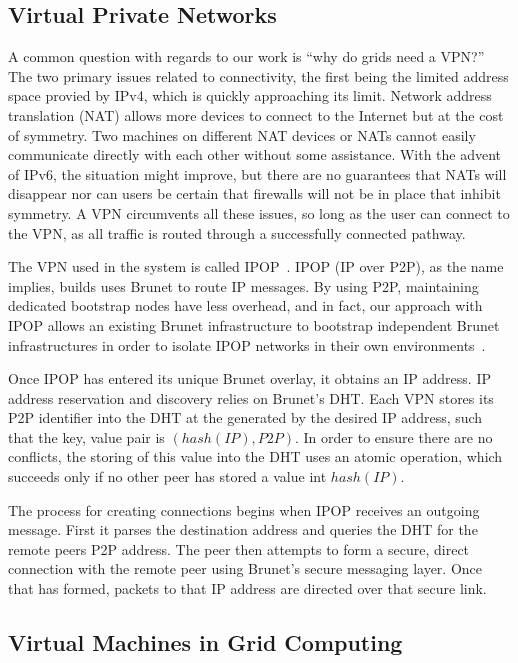 \documentclass[conference]{IEEEtran}
\begin{document}
\subsection{Virtual Private Networks}

A common question with regards to our work is ``why do grids need a VPN?'' The
two primary issues related to connectivity, the first being the limited address
space provied by IPv4, which is quickly approaching its limit.  Network address
translation (NAT) allows more devices to connect to the Internet but at the
cost of symmetry.  Two machines on different NAT devices or NATs cannot easily
communicate directly with each other without some assistance.  With the advent
of IPv6, the situation might improve, but there are no guarantees that NATs
will disappear nor can users be certain that firewalls will not be in place
that inhibit symmetry.  A VPN circumvents all these issues, so long as the user
can connect to the VPN, as all traffic is routed through a successfully
connected pathway.

The VPN used in the system is called IPOP~\cite{groupvpn, ipop}.  IPOP (IP over
P2P), as the name implies, builds uses Brunet to route IP messages.  By using
P2P, maintaining dedicated bootstrap nodes have less overhead, and in fact, our
approach with IPOP allows an existing Brunet infrastructure to bootstrap
independent Brunet infrastructures in order to isolate IPOP networks in their
own environments~\cite{virtual_private_overlays}.

Once IPOP has entered its unique Brunet overlay, it obtains an IP address.  IP
address reservation and discovery relies on Brunet's DHT.  Each VPN stores its
P2P identifier into the DHT at the generated by the desired IP address, such
that the key, value pair is $(hash(IP), P2P)$.  In order to ensure there are no
conflicts, the storing of this value into the DHT uses an atomic operation,
which succeeds only if no other peer has stored a value int $hash(IP)$.

The process for creating connections begins when IPOP receives an outgoing
message.  First it parses the destination address and queries the DHT for the
remote peers P2P address.  The peer then attempts to form a secure, direct
connection with the remote peer using Brunet's secure messaging layer.  Once
that has formed, packets to that IP address are directed over that secure link.

\subsection{Virtual Machines in Grid Computing}
\end{document}
